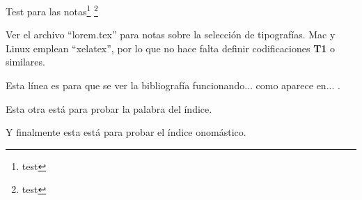 
%


Test para las notas\footnote{test} \footnote{test}

Ver el archivo \enquote{lorem.tex} para notas sobre la selección de tipografías. Mac y Linux emplean \enquote{xelatex}, por lo que no hace falta definir codificaciones \textbf{T1} o similares.

Esta línea es para que se ver la bibliografía funcionando... como aparece en... \cite{libro1}.

Esta otra está para probar la palabra del índice. 

Y finalmente esta está para probar el índice onomástico. 

\blindtext[2]

\Blindtext

\Blindtext